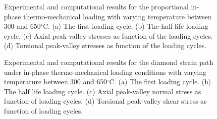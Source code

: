 \begin{figure}[!htp]
\caption{Experimental and computational results for the proportional in-phase thermo-mechanical loading with varying temperature between 300 and 650$^{\circ}$C. (a) The first loading cycle. (b) The half life loading cycle. (c) Axial peak-valley stresses as function of the loading cycles. (d) Torsional peak-valley stresses as function of the loading cycles.}
\label{Fig:TMF_Prop45}
\end{figure}

\begin{figure}
\caption{Experimental and computational results for the diamond strain path under in-phase thermo-mechanical loading conditions with varying temperature between  300 and 650$^{\circ}$C. (a) The first loading cycle. (b) The half life loading cycle. (c) Axial peak-valley normal stress as function of loading cycles. (d) Torsional peak-valley shear stress as function of  loading cycles.}
\label{Fig:TMF_Diamond}
\end{figure}


